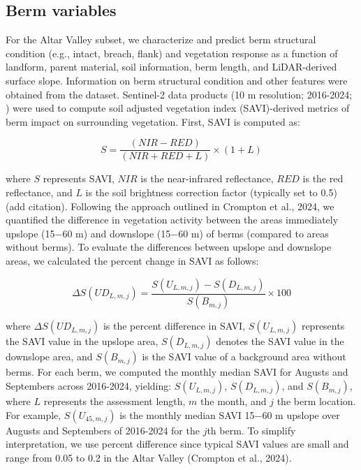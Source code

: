 \documentclass[review]{elsarticle}
\begin{document}
\subsection{Berm variables}

For the Altar Valley subset, we characterize and predict berm structural condition (e.g., intact, breach, flank) and vegetation response as a function of landform, parent material, soil information, berm length, and LiDAR-derived surface slope. Information on berm structural condition and other features were obtained from the \citet{nichols2021landscape} dataset. Sentinel-2 data products (10 m resolution; 2016-2024; \cite{drusch2012sentinel}) were used to compute soil adjusted vegetation index (SAVI)-derived metrics of berm impact on surrounding vegetation. First, SAVI is computed as:

\begin{equation}
 S = \frac{(NIR - RED)}{(NIR + RED + L)} \times (1 + L)
\end{equation}

\noindent where $S$ represents SAVI, $NIR$ is the near-infrared reflectance, $RED$ is the red reflectance, and $L$ is the soil brightness correction factor (typically set to 0.5) (add citation). Following the approach outlined in Crompton et al., 2024, we quantified the difference in vegetation activity between the areas immediately upslope (15$-$60 m) and downslope (15$-$60 m) of berms (compared to areas without berms). To evaluate the differences between upslope and downslope areas, we calculated the percent change in SAVI as follows:

\begin{equation}
\Delta S(U\!D_{L,m,j}) = \frac{S(U_{L,m,j}) - S(D_{L,m,j})}{S(B_{m,j})} \times 100
\end{equation}

\noindent where \(\Delta S(U\!D_{L,m,j})\) is the percent difference in SAVI, \(S(U_{L,m,j})\) represents the SAVI value in the upslope area, \(S(D_{L,m,j})\) denotes the SAVI value in the downslope area, and \(S(B_{m,j})\) is the SAVI value of a background area without berms. For each berm, we computed the monthly median SAVI for Augusts and Septembers across 2016-2024, yielding: $S(U_{L, m, j})$, $S(D_{L, m, j})$, and $S(B_{m,j})$, where $L$ represents the assessment length, $m$ the month, and $j$ the berm location. For example, $S(U_{45, m, j})$ is the monthly median SAVI 15$-$60 m upslope over Augusts and Septembers of 2016-2024 for the $j$th berm. To simplify interpretation, we use percent difference since typical SAVI values are small and range from 0.05 to 0.2 in the Altar Valley (Crompton et al., 2024). 
\end{document}
